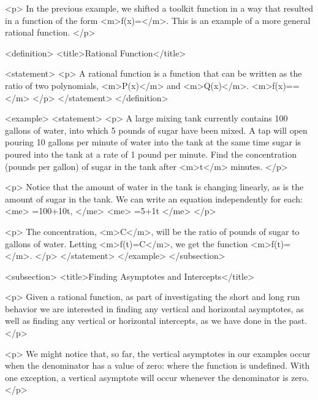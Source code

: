         <p>
            In the previous example, we shifted a toolkit function in a way that resulted in a function of the form <m>f(x)=</m>.
            This is an example of a more general rational function.
        </p>

        <definition>
            <title>Rational Function</title>

            <statement>
                <p>
                    A rational function is a function that can be written as the ratio of two polynomials, <m>P(x)</m> and <m>Q(x)</m>.
                    <m>f(x)==</m>
                </p>
            </statement>
        </definition>

        <example>
            <statement>
                <p>
                    A large mixing tank currently contains 100 gallons of water, into which 5 pounds of sugar have been mixed.
                    A tap will open pouring 10 gallons per minute of water into the tank at the same time sugar is poured into the tank at a rate of 1 pound per minute.
                    Find the concentration (pounds per gallon) of sugar in the tank after <m>t</m> minutes.
                </p>

                <p>
                    Notice that the amount of water in the tank is changing linearly, as is the amount of sugar in the tank.
                    We can write an equation independently for each:
                    <me>
                        =100+10t,
                    </me>
                    <me>
                        =5+1t
                    </me>
                </p>

                <p>
                    The concentration, <m>C</m>, will be the ratio of pounds of sugar to gallons of water.
                    Letting <m>f(t)=C</m>, we get the function <m>f(t)=</m>.
                </p>
            </statement>
        </example>
    </subsection>


    <subsection>
        <title>Finding Asymptotes and Intercepts</title>

        <p>
            Given a rational function, as part of investigating the short and long run behavior we are interested in finding any vertical and horizontal asymptotes, as well as finding any vertical or horizontal intercepts, as we have done in the past.
        </p>

        <p>
            We might notice that, so far, the vertical asymptotes in our examples occur when the denominator has a value of zero: where the function is undefined.
            With one exception, a vertical asymptote will occur whenever the denominator is zero.
        </p>

